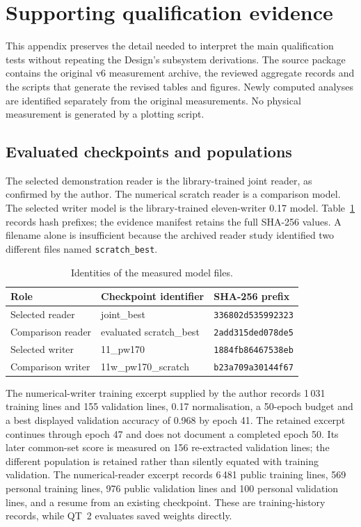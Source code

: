 \section{Supporting qualification evidence}
\label{app:res-evidence}
This appendix preserves the detail needed to interpret the main qualification tests without repeating the Design's subsystem derivations. The source package contains the original v6 measurement archive, the reviewed aggregate records and the scripts that generate the revised tables and figures. Newly computed analyses are identified separately from the original measurements. No physical measurement is generated by a plotting script.

\subsection{Evaluated checkpoints and populations}
The selected demonstration reader is the library-trained joint reader, as confirmed by the author. The numerical scratch reader is a comparison model. The selected writer model is the library-trained eleven-writer 0.17 model. Table~\ref{tab:app-checkpoints} records hash prefixes; the evidence manifest retains the full SHA-256 values. A filename alone is insufficient because the archived reader study identified two different files named \texttt{scratch\_best}.

\begin{table}[!htbp]\centering\small
\begin{tabular}{lll}\toprule
\textbf{Role} & \textbf{Checkpoint identifier} & \textbf{SHA-256 prefix}\\\midrule
Selected reader & joint\_best & \texttt{336802d535992323}\\
Comparison reader & evaluated scratch\_best & \texttt{2add315ded078de5}\\
Selected writer & 11\_pw170 & \texttt{1884fb86467538eb}\\
Comparison writer & 11w\_pw170\_scratch & \texttt{b23a709a30144f67}\\\bottomrule
\end{tabular}
\caption{Identities of the measured model files.}\label{tab:app-checkpoints}\end{table}

The numerical-writer training excerpt supplied by the author records 1\,031 training lines and 155 validation lines, 0.17 normalisation, a 50-epoch budget and a best displayed validation accuracy of 0.968 by epoch 41. The retained excerpt continues through epoch 47 and does not document a completed epoch 50. Its later common-set score is measured on 156 re-extracted validation lines; the different population is retained rather than silently equated with training validation. The numerical-reader excerpt records 6\,481 public training lines, 569 personal training lines, 976 public validation lines and 100 personal validation lines, and a resume from an existing checkpoint. These are training-history records, while QT~2 evaluates saved weights directly.

